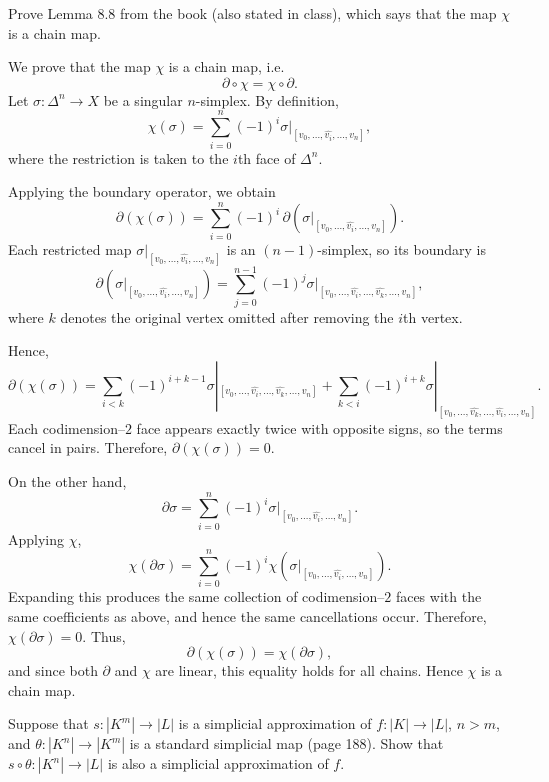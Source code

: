 \newcommand\St{\operatorname{St}}

\begin{problem}[1]
  Prove Lemma 8.8 from the book (also stated in class), which says that the map $\chi$ is a chain map.
\end{problem}

\begin{solution}
  We prove that the map $\chi$ is a chain map, i.e.
  \[%
    \partial \circ \chi = \chi \circ \partial
  .\]%
  Let $\sigma : \Delta^n \to X$ be a singular $n$-simplex. By definition,
  \[%
    \chi(\sigma) = \sum_{i=0}^n (-1)^i \sigma|_{[v_0,\dots,\widehat{v_i},\dots,v_n]}
  ,\]%
  where the restriction is taken to the $i$th face of $\Delta^n$.

  Applying the boundary operator, we obtain
  \[%
    \partial(\chi(\sigma)) = \sum_{i=0}^n (-1)^i \, \partial\!\left(\sigma|_{[v_0, \dots, \widehat{v_i}, \dots, v_n]}\right)
  .\]%
  Each restricted map $\sigma|_{[v_0, \dots, \widehat{v_i}, \dots, v_n]}$ is an $(n - 1)$-simplex, so its boundary is
  \[%
    \partial\!\left(\sigma|_{[v_0, \dots, \widehat{v_i}, \dots, v_n]}\right) = \sum_{j=0}^{n-1} (-1)^j \sigma|_{[v_0, \dots, \widehat{v_i}, \dots, \widehat{v_{k}}, \dots, v_n]}
  ,\]%
  where $k$ denotes the original vertex omitted after removing the $i$th vertex.

  Hence,
  \[%
    \partial(\chi(\sigma)) = \sum_{i<k} (-1)^{i+k-1} \sigma|_{[v_0, \dots, \widehat{v_i}, \dots, \widehat{v_k}, \dots, v_n]} + \sum_{k<i} (-1)^{i+k} \sigma|_{[v_0, \dots, \widehat{v_k}, \dots, \widehat{v_i}, \dots, v_n]}
  .\]%
  Each codimension--$2$ face appears exactly twice with opposite signs, so the terms cancel in pairs. Therefore, $\partial(\chi(\sigma)) = 0$.

  On the other hand,
  \[%
    \partial \sigma = \sum_{i=0}^n (-1)^i \sigma|_{[v_0, \dots, \widehat{v_i}, \dots, v_n]}
  .\]%
  Applying $\chi$,
  \[%
    \chi(\partial \sigma) = \sum_{i=0}^n (-1)^i \chi\!\left(\sigma|_{[v_0, \dots, \widehat{v_i}, \dots, v_n]}\right)
  .\]%
  Expanding this produces the same collection of codimension--$2$ faces with the same coefficients as above, and hence the same cancellations occur. Therefore, $\chi(\partial \sigma) = 0$.
  Thus,
  \[%
    \partial(\chi(\sigma)) = \chi(\partial \sigma)
  ,\]%
  and since both $\partial$ and $\chi$ are linear, this equality holds for all chains. Hence $\chi$ is a chain map.
\end{solution}

\begin{problem}[2]
  Suppose that $s : |K^m| \to |L|$ is a simplicial approximation of $f : |K| \to |L|$, $n > m$, and $\theta : |K^n| \to |K^m|$ is a standard simplicial map (page 188). Show that $s \circ \theta : |K^n| \to |L|$ is also a simplicial approximation of $f$.
\end{problem}

